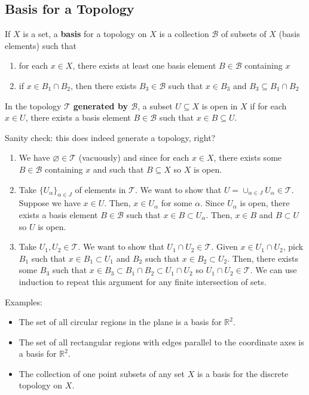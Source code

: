 \documentclass{article}
\newcommand{\nline}{\vspace*{0.5\baselineskip}}
\theoremstyle{definition}
\begin{document}
\begin{flushleft}
\subsection{Basis for a Topology}

If $X$ is a set, a \textbf{basis} for a topology on $X$ is a collection $\mathcal{B}$ of subsets of $X$ (basis elements) such that

\begin{enumerate}
    \item for each $x \in X$, there exists at least one basis element $B \in \mathcal{B}$ containing $x$
    \item if $x \in B_1 \cap B_2$, then there exists $B_3 \in \mathcal{B}$ such that $x \in B_3$ and $B_3 \subseteq B_1 \cap B_2$
\end{enumerate}

In the topology $\mathcal{T}$ \textbf{generated by $\mathcal{B}$}, a subset $U \subseteq X$ is open in $X$ if for each $x \in U$, there exists a basis element $B \in \mathcal{B}$ such that $x \in B \subseteq U$.

\nline

Sanity check: this does indeed generate a topology, right?

\begin{enumerate}
    \item We have $\varnothing \in \mathcal{T}$ (vacuously) and since for each $x \in X$, there exists some $B \in \mathcal{B}$ containing $x$ and such that $B \subseteq X$ so $X$ is open.
    \item Take $\{U_\alpha\}_{\alpha \in J}$ of elements in $\mathcal{T}$. We want to show that $U = \cup_{\alpha \in J} U_\alpha \in \mathcal{T}$. Suppose we have $x \in U$. Then, $x \in U_\alpha$ for some $\alpha$. Since $U_\alpha$ is open, there exists a basis element $B \in \mathcal{B}$ such that $x \in B \subset U_\alpha$. Then, $x \in B$ and $B \subset U$ so $U$ is open.
    \item Take $U_1, U_2 \in \mathcal{T}$. We want to show that $U_1 \cap U_2 \in \mathcal{T}$. Given $x \in U_1 \cap U_2$, pick $B_1$ such that $x \in B_1 \subset U_1$ and $B_2$ such that $x \in B_2 \subset U_2$. Then, there exists some $B_3$ such that $x \in B_3 \subset B_1 \cap B_2 \subset U_1 \cap U_2$ so $U_1 \cap U_2 \in \mathcal{T}$. We can use induction to repeat this argument for any finite intersection of sets.
\end{enumerate}

Examples:

\begin{itemize}
    \item The set of all circular regions in the plane is a basis for $\mathbb{R}^2$.
    \item The set of all rectangular regions with edges parallel to the coordinate axes is a basis for $\mathbb{R}^2$.
    \item The collection of one point subsets of any set $X$ is a basis for the discrete topology on $X$.
\end{itemize}


\end{flushleft}
\end{document}

